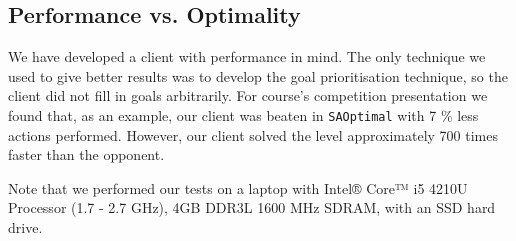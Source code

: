 \subsection{Performance vs. Optimality}
\label{sec:performance vs. optimality}

We have developed a client with performance in mind.
The only technique we used to give better results was to develop the goal prioritisation technique, so the client did not fill in goals arbitrarily.
For course's competition presentation we found that, as an example, our client was beaten in \texttt{SAOptimal} with 7 \% less actions performed. 
However, our client solved the level approximately 700 times faster than the opponent.

Note that we performed our tests on a laptop with Intel® Core™ i5 4210U Processor (1.7 - 2.7 GHz), 4GB DDR3L 1600 MHz SDRAM, with an SSD hard drive.
